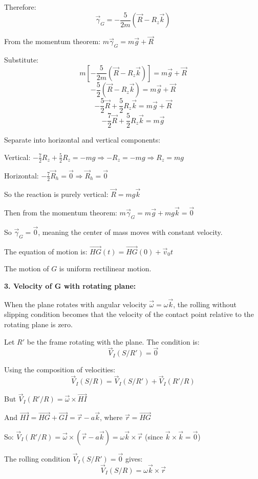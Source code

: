 \documentclass[12pt]{article}
\begin{document}
\begin{correctionbox}
Therefore:
$$\vec{\gamma}_G = -\frac{5}{2m}(\vec{R} - R_z\vec{k})$$

From the momentum theorem: $m\vec{\gamma}_G = m\vec{g} + \vec{R}$

Substitute:
$$m\left[-\frac{5}{2m}(\vec{R} - R_z\vec{k})\right] = m\vec{g} + \vec{R}$$
$$-\frac{5}{2}(\vec{R} - R_z\vec{k}) = m\vec{g} + \vec{R}$$
$$-\frac{5}{2}\vec{R} + \frac{5}{2}R_z\vec{k} = m\vec{g} + \vec{R}$$
$$-\frac{7}{2}\vec{R} + \frac{5}{2}R_z\vec{k} = m\vec{g}$$

Separate into horizontal and vertical components:

Vertical: $-\frac{7}{2}R_z + \frac{5}{2}R_z = -mg \Rightarrow -R_z = -mg \Rightarrow R_z = mg$

Horizontal: $-\frac{7}{2}\vec{R}_h = \vec{0} \Rightarrow \vec{R}_h = \vec{0}$

So the reaction is purely vertical: $\vec{R} = mg\vec{k}$

Then from the momentum theorem: $m\vec{\gamma}_G = m\vec{g} + mg\vec{k} = \vec{0}$

So $\vec{\gamma}_G = \vec{0}$, meaning the center of mass moves with constant velocity.

The equation of motion is: $\overrightarrow{HG}(t) = \overrightarrow{HG}(0) + \vec{v}_0 t$

The motion of $G$ is uniform rectilinear motion.

\textbf{3. Velocity of G with rotating plane:}

When the plane rotates with angular velocity $\vec{\omega} = \omega\vec{k}$, the rolling without slipping condition becomes that the velocity of the contact point relative to the rotating plane is zero.

Let $R'$ be the frame rotating with the plane. The condition is:
$$\vec{V}_I(S/R') = \vec{0}$$

Using the composition of velocities:
$$\vec{V}_I(S/R) = \vec{V}_I(S/R') + \vec{V}_I(R'/R)$$

But $\vec{V}_I(R'/R) = \vec{\omega} \times \overrightarrow{HI}$

And $\overrightarrow{HI} = \overrightarrow{HG} + \overrightarrow{GI} = \vec{r} - a\vec{k}$, where $\vec{r} = \overrightarrow{HG}$

So: $\vec{V}_I(R'/R) = \vec{\omega} \times (\vec{r} - a\vec{k}) = \omega\vec{k} \times \vec{r}$ (since $\vec{k} \times \vec{k} = \vec{0}$)

The rolling condition $\vec{V}_I(S/R') = \vec{0}$ gives:
$$\vec{V}_I(S/R) = \omega\vec{k} \times \vec{r}$$


\end{correctionbox}
\end{document}
